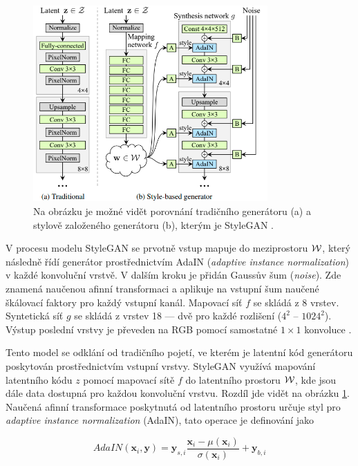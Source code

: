 \begin{figure}[hbt]
	\centering
	\includegraphics[width=0.8\textwidth]{obrazky-figures/struct-stylegan.png}
	\caption{Na obrázku je možné vidět porovnání tradičního generátoru (a) a stylově založeného generátoru (b), kterým je StyleGAN \cite{KarrasStyleGAN}.}
        \label{fig:stylegan}
\end{figure}

V procesu modelu StyleGAN se prvotně vstup mapuje do meziprostoru $\cal W$, který následně řídí generátor prostřednictvím AdaIN (\textit{adaptive instance normalization}) v každé konvoluční vrstvě. V dalším kroku je přidán Gaussův šum (\textit{noise}). Zde  znamená naučenou afinní transformaci a  aplikuje na vstupní šum naučené škálovací faktory pro každý vstupní kanál. Mapovací síť $f$ se skládá z 8 vrstev. Syntetická síť $g$ se skládá z vrstev 18 --- dvě pro každé rozlišení ($4^2$ -- $1024^2$). Výstup poslední vrstvy je převeden na RGB pomocí samostatné $1\times1$ konvoluce \cite{KarrasStyleGAN}.

Tento model se odklání od tradičního pojetí, ve kterém je latentní kód generátoru poskytován prostřednictvím vstupní vrstvy. StyleGAN využívá mapování latentního kódu $z$ pomocí mapovací sítě $f$ do latentního prostoru $\cal W$, kde jsou dále data dostupná pro každou konvoluční vrstvu. Rozdíl jde vidět na obrázku \ref{fig:stylegan}. Naučená afinní transformace poskytnutá od latentního prostoru určuje styl pro \textit{adaptive instance normalization} (AdaIN), tato operace je definování jako

\begin{equation}
    AdaIN(\textbf{x}_i, \textbf{y}) = \textbf{y}_{s,i} \frac{\textbf{x}_i - \mu(\textbf{x}_i)}{\sigma(\textbf{x}_i)}+\textbf{y}_{b,i}
    \label{eq:StyleGANAdaIN}
\end{equation}


